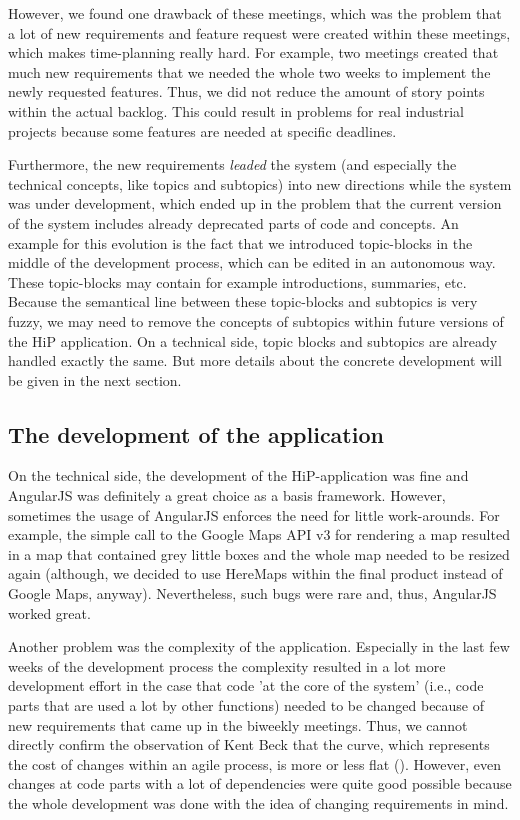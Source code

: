 However, we found one drawback of these meetings, which was the problem that a lot of new requirements and feature request were created within these meetings, which makes time-planning really hard. For example, two meetings created that much new requirements that we needed the whole two weeks to implement the newly requested features. Thus, we did not reduce the amount of story points within the actual backlog. This could result in problems for real industrial projects because some features are needed at specific deadlines.

Furthermore, the new requirements \emph{leaded} the system (and especially the technical concepts, like topics and subtopics) into new directions while the system was under development, which ended up in the problem that the current version of the system includes already deprecated parts of code and concepts. An example for this evolution is the fact that we introduced topic-blocks in the middle of the development process, which can be edited in an autonomous way. These topic-blocks may contain for example introductions, summaries, etc. Because the semantical line between these topic-blocks and subtopics is very fuzzy, we may need to remove the concepts of subtopics within future versions of the \ac{HiP} application. On a technical side, topic blocks and subtopics are already handled exactly the same. But more details about the concrete development will be given in the next section.

\subsection{The development of the application}
On the technical side, the development of the \ac{HiP}-application was fine and AngularJS was definitely a great choice as a basis framework. However, sometimes the usage of AngularJS enforces the need for little work-arounds. For example, the simple call to the Google Maps API v3 for rendering a map resulted in a map that contained grey little boxes and the whole map needed to be resized again (although, we decided to use HereMaps within the final product instead of Google Maps, anyway). Nevertheless, such bugs were rare and, thus, AngularJS worked great. 

Another problem was the complexity of the application. Especially in the last few weeks of the development process the complexity resulted in a lot more development effort in the case that code 'at the core of the system' (i.e., code parts that are used a lot by other functions) needed to be changed because of new requirements that came up in the biweekly meetings. Thus, we cannot directly confirm the observation of Kent Beck that the curve, which represents the cost of changes within an agile process, is more or less flat (\cite{beck2003test}). However, even changes at code parts with a lot of dependencies were quite good possible because the whole development was done with the idea of changing requirements in mind. 

